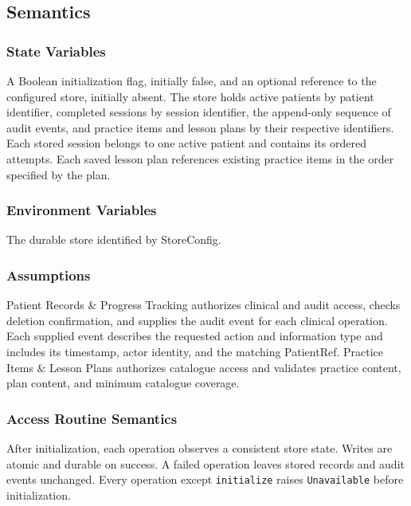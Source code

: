 \documentclass[12pt, titlepage]{article}
\begin{document}
\subsection{Semantics}

\subsubsection{State Variables}
A Boolean initialization flag, initially false, and an optional reference to
the configured store, initially absent. The store holds active patients by
patient identifier, completed sessions by session identifier, the append-only
sequence of audit events, and practice items and lesson plans by their
respective identifiers. Each stored session belongs to one active patient
and contains its ordered attempts. Each saved lesson plan references
existing practice items in the order specified by the plan.

\subsubsection{Environment Variables}
The durable store identified by StoreConfig.

\subsubsection{Assumptions}
Patient Records \& Progress Tracking authorizes clinical and audit access,
checks deletion confirmation, and supplies the audit event for each clinical
operation. Each supplied event describes the requested action and information
type and includes its timestamp, actor identity, and the matching PatientRef.
Practice Items \& Lesson Plans authorizes catalogue access and validates
practice content, plan content, and minimum catalogue coverage.

\subsubsection{Access Routine Semantics}
After initialization, each operation observes a consistent store state.
Writes are atomic and durable on success. A failed operation leaves stored
records and audit events unchanged. Every operation except
\texttt{initialize} raises \texttt{Unavailable} before initialization.
\end{document}
